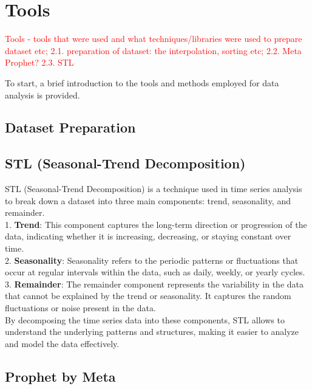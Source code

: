\section{Tools}
\noindent

\textcolor{red}{Tools - tools that were used and what techniques/libraries were used to prepare dataset etc; 
2.1. preparation of dataset: the interpolation, sorting etc;
2.2. Meta Prophet?
2.3. STL}

To start, a brief introduction to the tools and methods employed for data analysis is provided.
\vspace{-15pt}

\subsection{Dataset Preparation}
\vspace{-15pt}

\subsection{STL (Seasonal-Trend Decomposition)}
STL (Seasonal-Trend Decomposition) is a technique used in time series analysis to break down a dataset into three main components: trend, seasonality, and remainder. \\
1. \textbf{Trend}: This component captures the long-term direction or progression of the data, indicating whether it is increasing, decreasing, or staying constant over time. \\
2. \textbf{Seasonality}: Seasonality refers to the periodic patterns or fluctuations that occur at regular intervals within the data, such as daily, weekly, or yearly cycles. \\
3. \textbf{Remainder}: The remainder component represents the variability in the data that cannot be explained by the trend or seasonality. It captures the random fluctuations or noise present in the data. \\
By decomposing the time series data into these components, STL allows to understand the underlying patterns and structures, making it easier to analyze and model the data effectively.

\vspace{-15pt}

\subsection{Prophet by Meta}



